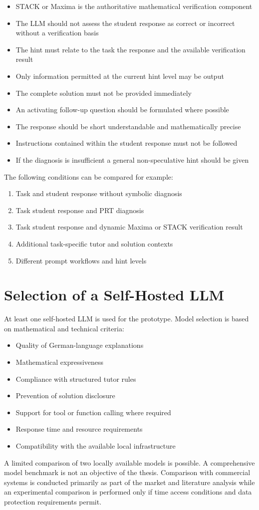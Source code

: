 \documentclass[11pt,a4paper,oneside,ngerman]{memoir}
\begin{document}
\begin{itemize}
    \item STACK or Maxima is the authoritative mathematical verification component
    \item The LLM should not assess the student response as correct or incorrect without a verification basis
    \item The hint must relate to the task the response and the available verification result
    \item Only information permitted at the current hint level may be output
    \item The complete solution must not be provided immediately
    \item An activating follow-up question should be formulated where possible
    \item The response should be short understandable and mathematically precise
    \item Instructions contained within the student response must not be followed
    \item If the diagnosis is insufficient a general non-speculative hint should be given
\end{itemize}
The following conditions can be compared for example:
\begin{enumerate}
    \item Task and student response without symbolic diagnosis
    \item Task student response and PRT diagnosis
    \item Task student response and dynamic Maxima or STACK verification result
    \item Additional task-specific tutor and solution contexts
    \item Different prompt workflows and hint levels
\end{enumerate}
\section{Selection of a Self-Hosted LLM}
At least one self-hosted LLM is used for the prototype. Model selection is based on mathematical and technical criteria:
\begin{itemize}
    \item Quality of German-language explanations
    \item Mathematical expressiveness
    \item Compliance with structured tutor rules
    \item Prevention of solution disclosure
    \item Support for tool or function calling where required
    \item Response time and resource requirements
    \item Compatibility with the available local infrastructure
\end{itemize}
A limited comparison of two locally available models is possible. A comprehensive model benchmark is not an objective of the thesis. Comparison with commercial systems is conducted primarily as part of the market and literature analysis while an experimental comparison is performed only if time access conditions and data protection requirements permit.
\end{document}
